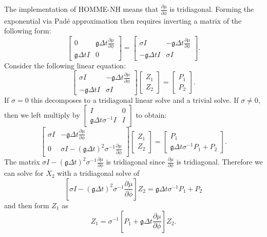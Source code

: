 \documentclass{csri19}
\newcommand{\CFKg}{\mathfrak{g}}
\begin{document}
The implementation of HOMME-NH means that $\frac{\partial\mu}{\partial\phi}$
 is tridiagonal.  Forming the exponential via Pad\'e approximation then 
requires inverting a matrix of the following form:
\[\begin{bmatrix} 0 & \CFKg\Delta t\frac{\partial\mu}{\partial\phi} \\
    \CFKg\Delta t I & 0 \end{bmatrix} =
 \begin{bmatrix} \sigma I  & -\CFKg\Delta t \frac{\partial\mu}{\partial\phi} \\
 -\CFKg\Delta t I          & \sigma I \end{bmatrix}.\]
Consider the following linear equation:
\[\begin{bmatrix} \sigma I  & -\CFKg\Delta t \frac{\partial\mu}{\partial\phi} \\
           -\CFKg\Delta t I & \sigma I \end{bmatrix}
\begin{bmatrix} Z_1 \\
 Z_2 \end{bmatrix} = 
\begin{bmatrix} P_1 \\
 P_2 \end{bmatrix}.\]
If $\sigma = 0$ this decomposes to a tridiagonal linear solve and a trivial solve. 
If $\sigma \neq 0$, then we left multiply by $\begin{bmatrix} I & 0 \\
                                     \CFKg\Delta t \sigma^{-1}I & I \end{bmatrix}$ to obtain:
\[\begin{bmatrix} 
 \sigma I  & -\CFKg\Delta t \frac{\partial\mu}{\partial\phi} \\
         0 & \sigma I -\left(\CFKg\Delta t\right)^2  \sigma^{-1}\frac{\partial\mu}{\partial\phi}
 \end{bmatrix}
 \begin{bmatrix} Z_1 \\
 Z_2 \end{bmatrix} = 
\begin{bmatrix} P_1 \\
 \CFKg\Delta t \sigma^{-1} P_1 +  P_2 \end{bmatrix}.\]
The matrix $\sigma I -\left(\CFKg\Delta t\right)^2\sigma^{-1}\frac{\partial\mu}{\partial\phi}$ 
is tridiagonal since $\frac{\partial\mu}{\partial\phi}$ is tridiagonal. 
Therefore we can solve for $X_2$ with a tridiagonal solve of 
\[\left[\sigma I -\left(\CFKg\Delta t \right)^2  \sigma^{-1}\frac{\partial\mu}{\partial\phi}\right]Z_2
 = \CFKg\Delta t\sigma^{-1} P_1 +  P_2\]
and then form $Z_1$ as 
\[Z_1 = \sigma^{-1}\left[P_1 + \CFKg\Delta t\frac{\partial \mu}{\partial \phi}\right] Z_2.\]
\end{document}

